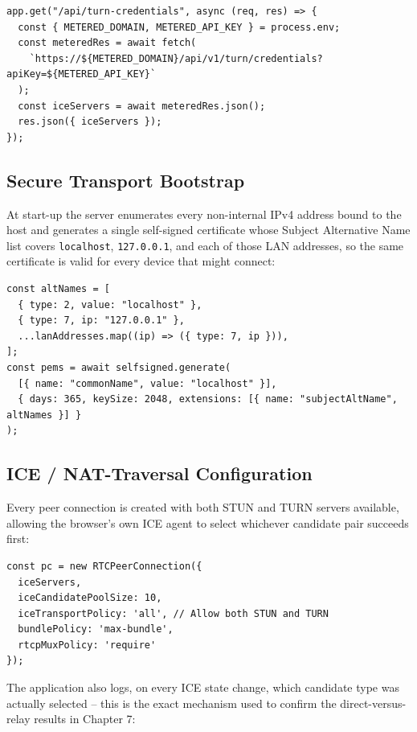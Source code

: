\documentclass[12pt,a4paper]{report}
\begin{document}
\begin{lstlisting}[caption={Server-side TURN credential proxy (server.js)}]
app.get("/api/turn-credentials", async (req, res) => {
  const { METERED_DOMAIN, METERED_API_KEY } = process.env;
  const meteredRes = await fetch(
    `https://${METERED_DOMAIN}/api/v1/turn/credentials?apiKey=${METERED_API_KEY}`
  );
  const iceServers = await meteredRes.json();
  res.json({ iceServers });
});
\end{lstlisting}

\subsection{Secure Transport Bootstrap}
At start-up the server enumerates every non-internal IPv4 address bound to the host and
generates a single self-signed certificate whose Subject Alternative Name list covers
\texttt{localhost}, \texttt{127.0.0.1}, and each of those LAN addresses, so the same
certificate is valid for every device that might connect:

\begin{lstlisting}[caption={Self-signed certificate generation (server.js)}]
const altNames = [
  { type: 2, value: "localhost" },
  { type: 7, ip: "127.0.0.1" },
  ...lanAddresses.map((ip) => ({ type: 7, ip })),
];
const pems = await selfsigned.generate(
  [{ name: "commonName", value: "localhost" }],
  { days: 365, keySize: 2048, extensions: [{ name: "subjectAltName", altNames }] }
);
\end{lstlisting}

\subsection{ICE / NAT-Traversal Configuration}
Every peer connection is created with both STUN and TURN servers available, allowing the
browser's own ICE agent to select whichever candidate pair succeeds first:

\begin{lstlisting}[caption={Peer connection configuration (public/script.js)}]
const pc = new RTCPeerConnection({
  iceServers,
  iceCandidatePoolSize: 10,
  iceTransportPolicy: 'all', // Allow both STUN and TURN
  bundlePolicy: 'max-bundle',
  rtcpMuxPolicy: 'require'
});
\end{lstlisting}

The application also logs, on every ICE state change, which candidate type was actually
selected -- this is the exact mechanism used to confirm the direct-versus-relay results in
Chapter 7:
\end{document}
